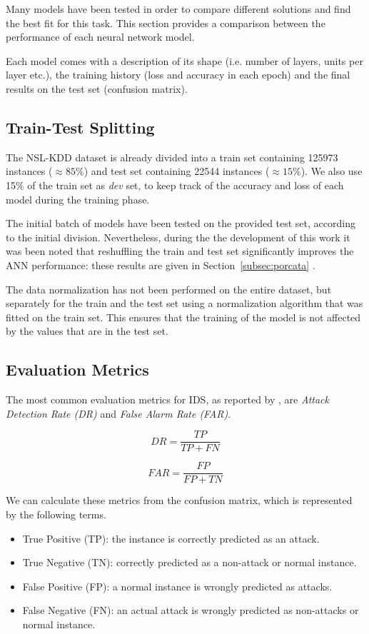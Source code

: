 
Many models have been tested in order to compare different solutions and find the best fit for this task. This section provides a comparison between the performance of each neural network model.

Each model comes with a description of its shape (i.e. number of layers, units per layer etc.), the training history (loss and accuracy in each epoch) and the final results on the test set (confusion matrix).

\subsection{Train-Test Splitting}
\label{subsec:traintest}

The NSL-KDD dataset is already divided into a train set containing 125973 instances ($\approx 85\%$) and test set containing 22544 instances ($\approx 15\%$). We also use 15\% of the train set as \textit{dev} set, to keep track of the accuracy and loss of each model during the training phase.

The initial batch of models have been tested on the provided test set, according to the initial division. Nevertheless, during the the development of this work it was been noted that reshuffling the train and test set significantly improves the ANN performance: these results are given in Section~\ref{subsec:porcata} .

The data normalization has not been performed on the entire dataset, but separately for the train and the test set using a normalization algorithm that was fitted on the train set. This ensures that the training of the model is not affected by the values that are in the test set.

\subsection{Evaluation Metrics}
\label{subsec:traintest}

The most common evaluation metrics for IDS, as reported by \cite{nslkdd2}, are \textit{Attack Detection Rate (DR)} and \textit{False Alarm Rate (FAR)}.

$$DR = \frac{TP}{TP+FN}$$

$$FAR = \frac{FP}{FP+TN}$$

We can calculate these metrics from the confusion matrix, which is represented by the following terms.

\begin{itemize}
    \item True Positive (TP): the instance is correctly predicted as an attack.
    \item True Negative (TN): correctly predicted as a non-attack or normal instance.
    \item False Positive (FP): a normal instance is wrongly predicted as attacks. 
    \item False Negative (FN): an actual attack is wrongly predicted as non-attacks or normal instance.
\end{itemize}

